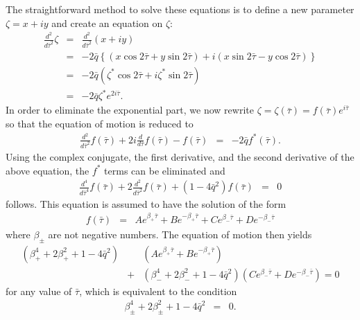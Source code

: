 \documentclass{article}
\begin{document}
The straightforward method to solve these equations is to define a new parameter $\zeta = x + iy$ and create an equation on $\zeta$:
\begin{eqnarray*}
\frac{d^2}{d\bar{\tau}^2} \zeta & = & \frac{d^2}{d\bar{\tau}^2} (x + iy) \\
& = & -2\bar{q} \left\{ (x\cos{2\bar{\tau}}+y\sin{2\bar{\tau}}) + i (x\sin{2\bar{\tau}}-y\cos{2\bar{\tau}}) \right\} \\
& = & -2\bar{q} \left( \zeta^* \cos{2\bar{\tau}} + i\zeta^* \sin{2\bar{\tau}} \right) \\
& = & -2\bar{q} \zeta^* e^{2i\bar{\tau}}.
\end{eqnarray*}
In order to eliminate the exponential part, we now rewrite $\zeta = \zeta\left(\bar{\tau}\right) = f\left(\bar{\tau}\right) e^{i\bar{\tau}}$ so that the equation of motion is reduced to
\begin{eqnarray*}
\frac{d^2}{d\bar{\tau}^2} f\left(\bar{\tau}\right) + 2i\frac{d}{d\bar{\tau}} f\left(\bar{\tau}\right) - f\left(\bar{\tau}\right) & = & -2\bar{q}f^*\left(\bar{\tau}\right).
\end{eqnarray*}
Using the complex conjugate, the first derivative, and the second derivative of the above equation, the $f^*$ terms can be eliminated and
\begin{eqnarray*}
\frac{d^4}{d\bar{\tau}^4}f\left(\bar{\tau}\right) + 2\frac{d^2}{d\bar{\tau}^2}f\left(\bar{\tau}\right) + \left(1-4\bar{q}^2\right)f\left(\bar{\tau}\right) & = & 0
\end{eqnarray*}
follows. This equation is assumed to have the solution of the form
\begin{eqnarray*}
f\left(\bar{\tau}\right) & = & Ae^{\beta_+\bar{\tau}} + Be^{-\beta_+\bar{\tau}} + Ce^{\beta_-\bar{\tau}} + De^{-\beta_-\bar{\tau}}
\end{eqnarray*}
where $\beta_\pm$ are not negative numbers. The equation of motion then yields
\begin{eqnarray*}
\left( \beta_+^4 + 2\beta_+^2 + 1-4\bar{q}^2 \right) & & \left( Ae^{\beta_+\bar{\tau}} + Be^{-\beta_+\bar{\tau}} \right) \\
& + & \left( \beta_-^4 + 2\beta_-^2 + 1-4\bar{q}^2 \right)\left( Ce^{\beta_-\bar{\tau}} + De^{-\beta_-\bar{\tau}} \right) = 0
\end{eqnarray*}
for any value of $\bar{\tau}$, which is equivalent to the condition
\begin{eqnarray*}
\beta_\pm^4 + 2\beta_\pm^2 + 1 - 4\bar{q}^2 & = & 0.
\end{eqnarray*}
\end{document}
